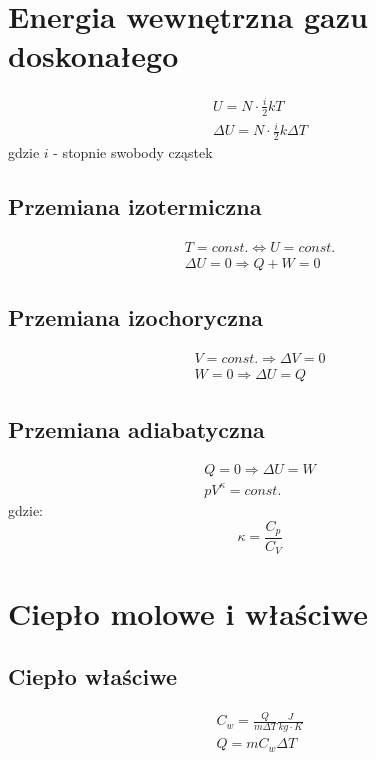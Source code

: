     \section{Energia wewnętrzna gazu doskonałego}
      \begin{gather}
        U = N\cdot\frac{i}{2}kT\\
        \Delta U = N\cdot\frac{i}{2}k\Delta T
      \end{gather}
      gdzie $i$ - stopnie swobody cząstek
      \subsection{Przemiana izotermiczna}
        \begin{gather}
          T = const. \Leftrightarrow U = const.\\
          \Delta U = 0 \Rightarrow Q + W = 0
        \end{gather}
      \subsection{Przemiana izochoryczna}
        \begin{gather}
          V = const. \Rightarrow \Delta V = 0\\
          W = 0 \Rightarrow \Delta U = Q
        \end{gather}
      \subsection{Przemiana adiabatyczna}
        \begin{gather}
          Q = 0 \Rightarrow \Delta U = W\\
          pV^\kappa = const.
        \end{gather}
        gdzie:
        \begin{equation}
          \kappa = \frac{C_p}{C_V}
        \end{equation}
    \section{Ciepło molowe i właściwe}
      \subsection{Ciepło właściwe}
        \begin{gather}
          C_w = \frac{Q}{m\Delta T} \unit{\frac{J}{kg\cdot K}}\\
          Q = mC_w\Delta T
        \end{gather}
